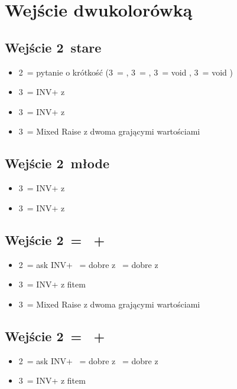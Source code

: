 \documentclass[12pt, a4paper]{article}
\newcommand*\link[1]{\hspace*{0em plus 1fill}\makebox{#1}}
\newcommand{\imp}{\color{BurntOrange}\link{\textbf{\large!}}\color{black}}
\begin{document}
\pagebreak
\section{Wejście dwukolorówką}
\subsection*{Wejście 2\diams\ stare}
\begin{itemize}
    \item 2\nt\ = pytanie o krótkość (3\clubs\ = \clubs, 3\diams\ = \diams, 3\hearts\ = void \clubs, 3\spades\ = void \diams)
    \item 3\clubs\ = INV+ z \hearts
    \item 3\diams\ = INV+ z \spades
    \item 3\major\ = Mixed Raise z dwoma grającymi wartościami
\end{itemize}

\subsection*{Wejście 2\ntx\ młode}
\begin{itemize}
    \item 3\hearts\ = INV+ z \clubs\
    \item 3\spades\ = INV+ z \diams\
\end{itemize}

\subsection*{Wejście 2\hearts\ = \spades\ + \minor}
\begin{itemize}
    \item 2\nt\ = ask INV+
    \hearts\ = dobre z \clubs
    \subitem 3\spades\ = dobre z \diams
    \item 3\diams\ = INV+ z fitem \spades \imp
    \item 3\spades\ = Mixed Raise z dwoma grającymi wartościami
\end{itemize}

\subsection*{Wejście 2\spades\ = \hearts\ + \minor}
\begin{itemize}
    \item 2\nt\ = ask INV+
    \hearts\ = dobre z \clubs 
    \subitem 3\spades\ = dobre z \diams
    \item 3\diams\ = INV+ z fitem \hearts \imp
\end{itemize}  
\end{document}

